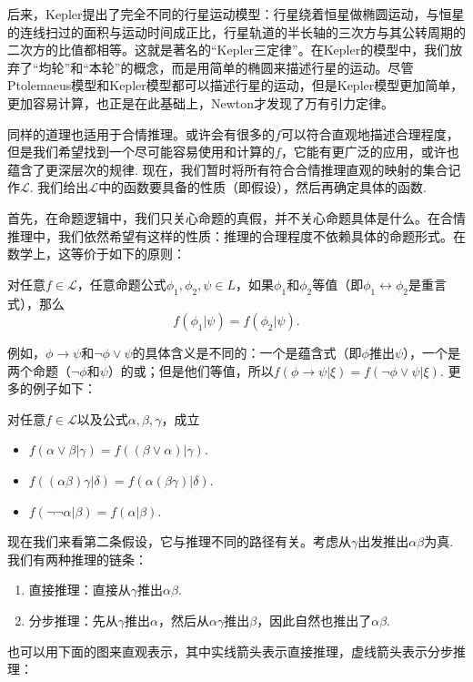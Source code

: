 后来，Kepler提出了完全不同的行星运动模型：行星绕着恒星做椭圆运动，与恒星的连线扫过的面积与运动时间成正比，行星轨道的半长轴的三次方与其公转周期的二次方的比值都相等。这就是著名的“Kepler三定律”。在Kepler的模型中，我们放弃了“均轮”和“本轮”的概念，而是用简单的椭圆来描述行星的运动。尽管Ptolemaeus模型和Kepler模型都可以描述行星的运动，但是Kepler模型更加简单，更加容易计算，也正是在此基础上，Newton才发现了万有引力定律。

同样的道理也适用于合情推理。或许会有很多的$f$可以符合直观地描述合理程度，但是我们希望找到一个尽可能容易使用和计算的$f$，它能有更广泛的应用，或许也蕴含了更深层次的规律. 现在，我们暂时将所有符合合情推理直观的映射的集合记作$\mathcal L$. 我们给出$\mathcal L$中的函数要具备的性质（即假设），然后再确定具体的函数. 

首先，在命题逻辑中，我们只关心命题的真假，并不关心命题具体是什么。在合情推理中，我们依然希望有这样的性质：推理的合理程度不依赖具体的命题形式。在数学上，这等价于如下的原则：

\begin{principle}[等值原则]
    对任意$f\in\mathcal L$，任意命题公式$\phi_1,\phi_2,\psi\in L$，如果$\phi_1$和$\phi_2$等值（即$\phi_1\leftrightarrow\phi_2$是重言式），那么
    \[
        f(\phi_1|\psi)=f(\phi_2|\psi).
    \]
\end{principle}

例如，$\phi\to \psi$和$\neg \phi\vee \psi$的具体含义是不同的：一个是蕴含式（即$\phi$推出$\psi$），一个是两个命题（$\neg \phi$和$\psi$）的或；但是他们等值，所以$f(\phi\to \psi | \xi)=f(\neg \phi\vee \psi|\xi)$. 更多的例子如下：

\begin{example}
    对任意$f\in\mathcal L$以及公式$\alpha,\beta,\gamma$，成立
    \begin{itemize}
        \item $f(\alpha\vee \beta | \gamma)=f((\beta\vee \alpha) | \gamma)$.
        \item $f((\alpha\beta)\gamma|\delta)=f(\alpha(\beta\gamma)|\delta)$.
        \item $f(\neg\neg \alpha|\beta)=f(\alpha|\beta)$.
    \end{itemize}
\end{example}

现在我们来看第二条假设，它与推理不同的路径有关。考虑从$\gamma$出发推出$\alpha\beta$为真. 我们有两种推理的链条：
\begin{enumerate}
    \item 直接推理：直接从$\gamma$推出$\alpha\beta$.
    \item 分步推理：先从$\gamma$推出$\alpha$，然后从$\alpha\gamma$推出$\beta$，因此自然也推出了$\alpha\beta$.
\end{enumerate}
也可以用下面的图来直观表示，其中实线箭头表示直接推理，虚线箭头表示分步推理：

